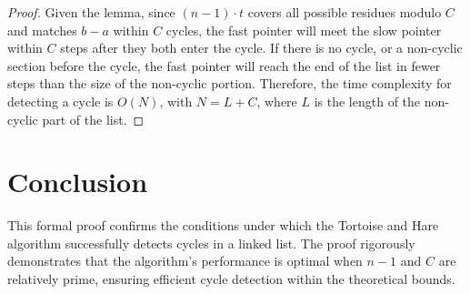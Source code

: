 \documentclass{article}
\begin{document}
\begin{proof}
Given the lemma, since \( (n - 1) \cdot t \) covers all possible residues modulo \( C \) and matches \( b - a \) within \( C \) cycles, the fast pointer will meet the slow pointer within \( C \) steps after they both enter the cycle. If there is no cycle, or a non-cyclic section before the cycle, the fast pointer will reach the end of the list in fewer steps than the size of the non-cyclic portion. Therefore, the time complexity for detecting a cycle is \( O(N) \), with \( N = L + C \), where \( L \) is the length of the non-cyclic part of the list.
\end{proof}

\section{Conclusion}
This formal proof confirms the conditions under which the Tortoise and Hare algorithm successfully detects cycles in a linked list. The proof rigorously demonstrates that the algorithm's performance is optimal when \( n - 1 \) and \( C \) are relatively prime, ensuring efficient cycle detection within the theoretical bounds.
\end{document}
